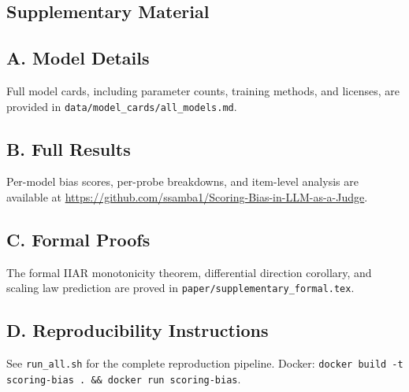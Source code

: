 \documentclass[11pt,twocolumn]{article}
\begin{document}
\begin{appendix}
\section*{Supplementary Material}
\subsection*{A. Model Details}
\label{app:models}
Full model cards, including parameter counts, training methods, and licenses, are provided in \texttt{data/model\_cards/all\_models.md}.

\subsection*{B. Full Results}
\label{app:results}
Per-model bias scores, per-probe breakdowns, and item-level analysis are available at \url{https://github.com/ssamba1/Scoring-Bias-in-LLM-as-a-Judge}.

\subsection*{C. Formal Proofs}
\label{app:proofs}
The formal IIAR monotonicity theorem, differential direction corollary, and scaling law prediction are proved in \texttt{paper/supplementary\_formal.tex}.

\subsection*{D. Reproducibility Instructions}
\label{app:reproduce}
See \texttt{run\_all.sh} for the complete reproduction pipeline. Docker: \texttt{docker build -t scoring-bias . \&\& docker run scoring-bias}.
\end{appendix}
\end{document}
